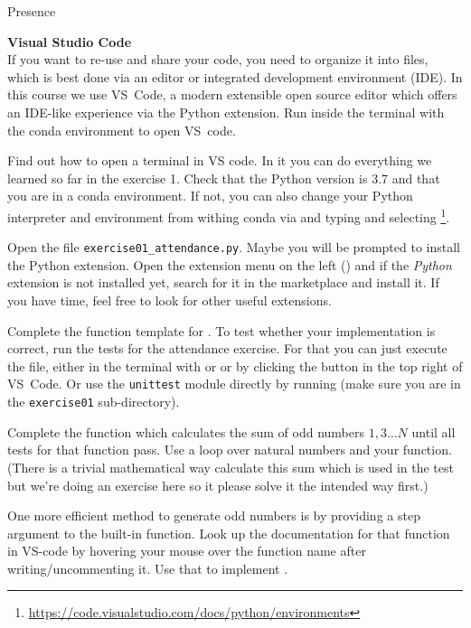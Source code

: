 \documentclass[a4paper, draft=False]{scrartcl}
\begin{document}
\begin{exam}[Presence]{Presence}
\begin{instructions}
    \begin{problem*}\textbf{Visual Studio Code}\\
      If you want to re-use and share your code, you need to organize it into
      files, which is best done via an editor or integrated development
      environment (IDE). In this course we use VS~Code, a modern extensible open
      source editor which offers an IDE-like experience via the Python extension.
      Run  inside the terminal with the conda environment to open
      VS~code.
      \begin{parts}
      \item Find out how to open a terminal in VS code. In it you can do
        everything we learned so far in the exercise 1. Check that the Python
        version is 3.7 and that you are in a conda environment. If not, you can
        also change your Python interpreter and environment from withing conda
        via  and typing and selecting \footnote{\url{https://code.visualstudio.com/docs/python/environments}}.
      \item Open the file \texttt{exercise01\_attendance.py}. Maybe you will be
        prompted to install the Python extension. Open the extension
        menu on the left () and if the \emph{Python} extension is
        not installed yet, search for it in the marketplace and install it.
        If you have time, feel free to look for other useful extensions.
      \item Complete the function template for . To test whether
        your implementation is correct, run the tests for the attendance
        exercise. For that you can just execute the file, either in the terminal
        with  or or by clicking the
        \menu{$\triangleright$} button in the top right of VS~Code. Or use the
        \texttt{unittest} module directly by running 
        (make sure you are in the \texttt{exercise01} sub-directory).
      \item Complete the function  which calculates the
        sum of odd numbers $1, 3 \ldots N$ until all tests for that function
        pass. Use a  loop over natural numbers and your 
        function. (There is a trivial mathematical way calculate this sum which
        is used in the test but we're doing an exercise here so it please solve
        it the intended way first.)
      \item One more efficient method to generate odd numbers is by providing a
        step argument to the built-in  function. Look up the
        documentation for that function in VS-code by hovering your mouse over
        the function name after writing/uncommenting it. Use that to implement
        .
      \end{parts}
    \end{problem*}


\end{instructions}
\end{exam}
\end{document}
